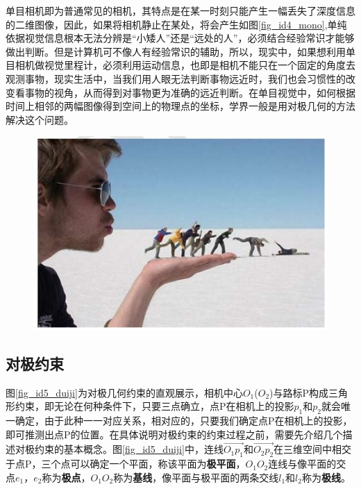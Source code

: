 \documentclass[10.5pt,twocolumn]{jbuaa}
\begin{document}
单目相机即为普通常见的相机，其特点是在某一时刻只能产生一幅丢失了深度信息的二维图像，因此，如果将相机静止在某处，将会产生如图\ref{fig_id4_mono},单纯依据视觉信息根本无法分辨是“小矮人”还是“远处的人”，必须结合经验常识才能够做出判断。但是计算机可不像人有经验常识的辅助，所以，现实中，如果想利用单目相机做视觉里程计，必须利用运动信息，也即是相机不能只在一个固定的角度去观测事物，现实生活中，当我们用人眼无法判断事物远近时，我们也会习惯性的改变看事物的视角，从而得到对事物更为准确的远近判断。在单目视觉中，如何根据时间上相邻的两幅图像得到空间上的物理点的坐标，学界一般是用对极几何的方法解决这个问题。

\begin{figure}[h!]
	\centering
	\includegraphics [scale=0.4,trim=0 0 0 0]{./image/mono}
\end{figure}


\subsection{对极约束}
图\ref{fig_id5_duiji}为对极几何约束的直观展示，相机中心$ O_{1} $($ O_{2} $)与路标P构成三角形约束，即无论在何种条件下，只要三点确立，点P在相机上的投影$ p_{1} $和$ p_{2} $就会唯一确定，由于此种一一对应关系，相对应的，只要我们确定点P在相机上的投影，即可推测出点P的位置。在具体说明对极约束的约束过程之前，需要先介绍几个描述对极约束的基本概念。图\ref{fig_id5_duiji}中，连线$\overrightarrow{O_{1}p_{1}}$和$\overrightarrow{O_{2}p_{2}}$在三维空间中相交于点P，三个点可以确定一个平面，称该平面为\textbf{极平面}，$ O_{1}O_{2} $连线与像平面的交点$ e_{1} $，$ e_{2} $称为\textbf{极点}，$ O_{1}O_{2} $称为\textbf{基线}，像平面与极平面的两条交线$ l_{1} $和$ l_{2} $称为\textbf{极线}。
\end{document}
